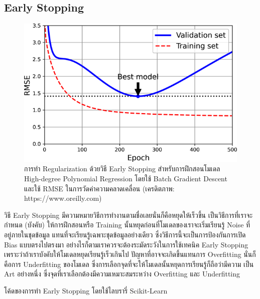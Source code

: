 \subsection{Early Stopping}
\label{ssec:early_stop}

\begin{figure}[htbp]
    \centering
    \includegraphics[width=0.9\linewidth]{fig/early_stopping.png}
    \caption{การทำ Regularization ด้วยวิธี Early Stopping สำหรับการฝึกสอนโมเดล High-degree Polynomial Regression 
    โดยใช้ Batch Gradient Descent และใช้ RMSE ในการวัดค่าความคลาดเคลื่อน (เครดิตภาพ: https://www.oreilly.com)}
    \label{fig:early_stopping}
\end{figure}

วิธี Early Stopping มีความหมายวิธีการทำงานตามชื่อเลยนั่นก็คือหยุดให้เร็วขึ้น เป็นวิธีการที่เราจะกำหนด (บังคับ) ให้การฝึกสอนหรือ Training 
นั้นหยุดก่อนที่โมเดลของเราจะเริ่มเรียนรู้ Noise ที่อยู่ภายในชุดข้อมูล แทนที่จะเรียนรู้เฉพาะชุดข้อมูลอย่างเดียว ซึ่งวิธีการนี้จะเป็นการป้องกันการเปิด 
Bias แบบตรงไปตรงมา อย่างไรก็ตามเราควรจะต้องระมัดระวังในการใช้เทคนิค Early Stopping เพราะว่าถ้าเราบังคับให้โมเดลหยุดเรียนรู้เร็วเกินไป
ปัญหาที่อาจจะเกิดขึ้นแทนการ Overfitting นั่นก็คือการ Underfitting ของโมเดล ซึ่งการเลือกจุดที่จะให้โมเดลนั้นหยุดการเรียนรู้ก็ถือว่ามีความ%
เป็น Art อย่างหนึ่ง ซึ่งจุดที่เราเลือกต้องมีความเหมาะสมระหว่าง Overfitting และ Underfitting

\noindent โค้ดของการทำ Early Stopping โดยใช้ไลบรารี่ Scikit-Learn


